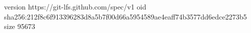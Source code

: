 version https://git-lfs.github.com/spec/v1
oid sha256:212f8c6f913396283d8a5b7f00d66a5954589ae4eaff74b3577dd6edce2273b5
size 95673
